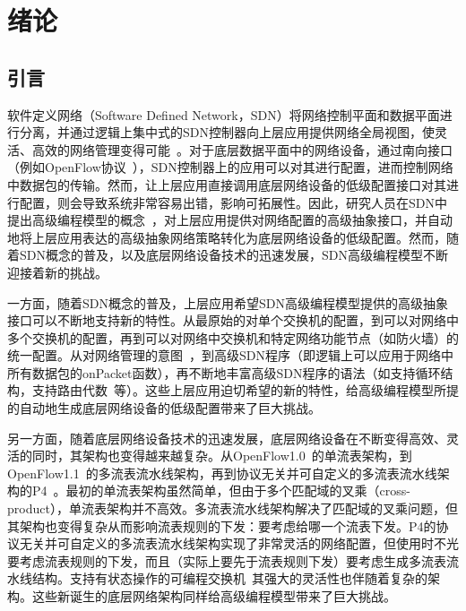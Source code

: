 \chapter{绪论}

\section{引言}

软件定义网络（Software Defined Network，SDN）将网络控制平面和数据平面进行分离，并通过逻辑上集中式的SDN控制器向上层应用提供网络全局视图，使灵活、高效的网络管理变得可能~\cite{mckeown2008openflow,feamster2013road,b4}。对于底层数据平面中的网络设备，通过南向接口（例如OpenFlow协议~\cite{mckeown2008openflow}），SDN控制器上的应用可以对其进行配置，进而控制网络中数据包的传输。然而，让上层应用直接调用底层网络设备的低级配置接口对其进行配置，则会导致系统非常容易出错，影响可拓展性。因此，研究人员在SDN中提出高级编程模型的概念~\cite{foster2011frenetic,maple,reich2013modular}，对上层应用提供对网络配置的高级抽象接口，并自动地将上层应用表达的高级抽象网络策略转化为底层网络设备的低级配置。然而，随着SDN概念的普及，以及底层网络设备技术的迅速发展，SDN高级编程模型不断迎接着新的挑战。

一方面，随着SDN概念的普及，上层应用希望SDN高级编程模型提供的高级抽象接口可以不断地支持新的特性。从最原始的对单个交换机的配置，到可以对网络中多个交换机的配置，再到可以对网络中交换机和特定网络功能节点（如防火墙）的统一配置。从对网络管理的意图~\cite{berde2014onos}，到高级SDN程序（即逻辑上可以应用于网络中所有数据包的onPacket函数），再不断地丰富高级SDN程序的语法（如支持循环结构，支持路由代数~\cite{gao2018t}等）。这些上层应用迫切希望的新的特性，给高级编程模型所提的自动地生成底层网络设备的低级配置带来了巨大挑战。

另一方面，随着底层网络设备技术的迅速发展，底层网络设备在不断变得高效、灵活的同时，其架构也变得越来越复杂。从OpenFlow1.0~\cite{openflow1}的单流表架构，到OpenFlow1.1~\cite{openflow1-1}的多流表流水线架构，再到协议无关并可自定义的多流表流水线架构的P4~\cite{P4}。最初的单流表架构虽然简单，但由于多个匹配域的叉乘（cross-product），单流表架构并不高效。多流表流水线架构解决了匹配域的叉乘问题，但其架构也变得复杂从而影响流表规则的下发：要考虑给哪一个流表下发。P4的协议无关并可自定义的多流表流水线架构实现了非常灵活的网络配置，但使用时不光要考虑流表规则的下发，而且（实际上要先于流表规则下发）要考虑生成多流表流水线结构。支持有状态操作的可编程交换机~\cite{moshref2014flow,bianchi2014openstate}其强大的灵活性也伴随着复杂的架构。这些新诞生的底层网络架构同样给高级编程模型带来了巨大挑战。

